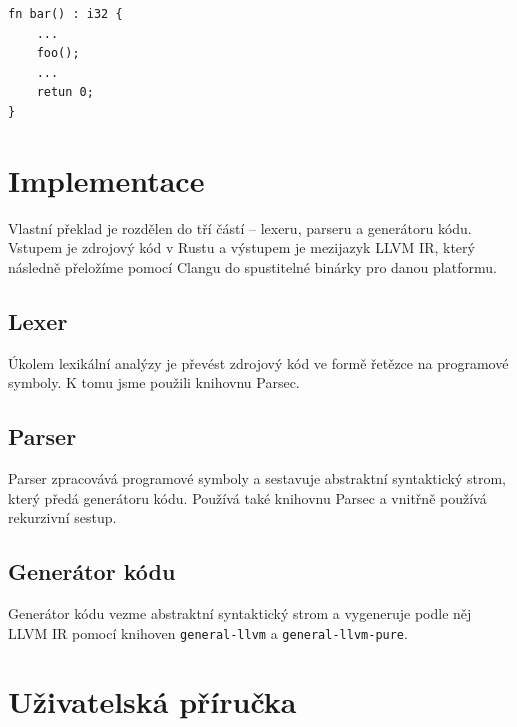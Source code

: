 \documentclass[12pt,a4paper]{article}
\begin{document}
\begin{verbatim}
fn bar() : i32 {
    ...
    foo();
    ...
    retun 0;
}
\end{verbatim}


\section{Implementace}

Vlastní překlad je rozdělen do tří částí -- lexeru, parseru a generátoru kódu. Vstupem je zdrojový kód v Rustu a výstupem je mezijazyk LLVM IR, který následně přeložíme pomocí Clangu do spustitelné binárky pro danou platformu.

\subsection{Lexer}

Úkolem lexikální analýzy je převést zdrojový kód ve formě řetězce na programové symboly. K tomu jsme použili knihovnu Parsec.

\subsection{Parser}

Parser zpracovává programové symboly a sestavuje abstraktní syntaktický strom, který předá generátoru kódu. Používá také knihovnu Parsec a vnitřně používá rekurzivní sestup.

\subsection{Generátor kódu}

Generátor kódu vezme abstraktní syntaktický strom a vygeneruje podle něj LLVM IR pomocí knihoven \texttt{general-llvm} a \texttt{general-llvm-pure}.


\section{Uživatelská příručka}
\end{document}
